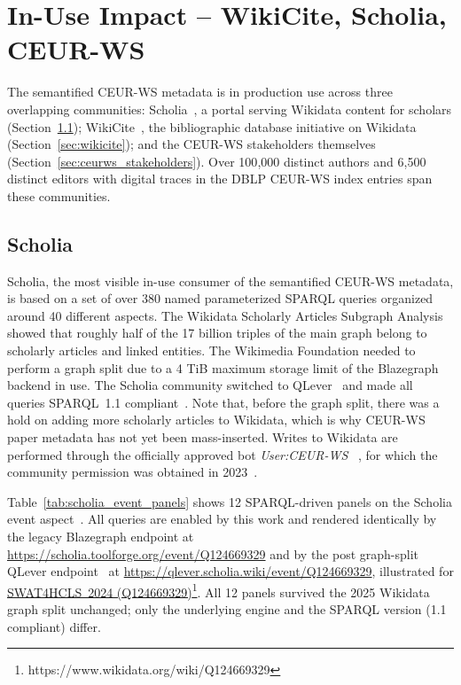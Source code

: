 \documentclass[runningheads]{llncs}
\newcommand{\footnotelink}[2]{\href{#1}{#2}\footnote{#1}}
\newcommand{\wdq}[2]{\footnotelink{https://www.wikidata.org/wiki/#2}{#1 (#2)}}
\begin{document}
\section{In-Use Impact -- WikiCite, Scholia, CEUR-WS}
\label{sec:Community Impact}
The semantified CEUR-WS metadata is in production use across three overlapping communities: Scholia~\cite{Nielsen2017}, 
a portal serving Wikidata content for scholars (Section~\ref{sec:scholia_inuse}); WikiCite~\cite{WikiCite}, 
the bibliographic database initiative on Wikidata (Section~\ref{sec:wikicite}); 
and the CEUR-WS stakeholders themselves (Section~\ref{sec:ceurws_stakeholders}).
 Over 100{,}000 distinct authors and 6{,}500 distinct editors with digital traces in 
 the DBLP CEUR-WS index entries span these communities.

\subsection{Scholia}
\label{sec:scholia_inuse}
Scholia, the most visible in-use consumer of the semantified CEUR-WS metadata, is based on a set of over 380 named parameterized SPARQL queries organized around 40 different aspects. The Wikidata Scholarly Articles Subgraph Analysis~\cite{AKhatun2021} showed that roughly half of the 17 billion triples of the main graph belong to scholarly articles and linked entities. The Wikimedia Foundation needed to perform a graph split due to a 4 TiB maximum storage limit of the Blazegraph backend in use. The Scholia community switched to QLever~\cite{Bast2017} and made all queries SPARQL~1.1 compliant~\cite{Willighagen2026Scholia}.
Note that, before the graph split, there was a hold on adding more scholarly
articles to Wikidata, which is why CEUR-WS paper metadata has not yet been
mass-inserted.
Writes to Wikidata are performed through the officially approved bot \textit{User:CEUR-WS}~\cite{CEURWSBot} , for which the community permission was obtained in 2023~\cite{ceur-ws-bot-rquest2023}.

Table~\ref{tab:scholia_event_panels}
shows 12 SPARQL-driven panels on the Scholia event
aspect~\cite{Nielsen2017}.
All queries are enabled by this work and rendered identically by the legacy Blazegraph
endpoint at
\url{https://scholia.toolforge.org/event/Q124669329} and by the post
graph-split QLever endpoint~\cite{Bast2017,Willighagen2026Scholia} at
\url{https://qlever.scholia.wiki/event/Q124669329}, illustrated for \wdq{SWAT4HCLS~2024}{Q124669329}. All 12 panels survived the
2025 Wikidata graph split unchanged; only the underlying engine and the
SPARQL version (1.1 compliant) differ.
\end{document}
